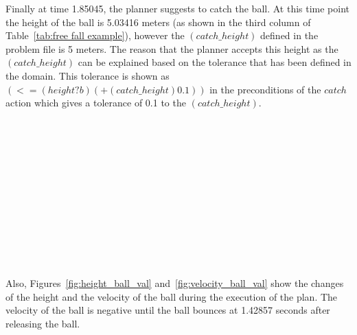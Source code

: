 Finally at time 1.85045, the planner suggests to catch the ball. At this time point the height of the ball is 5.03416 meters (as shown in the third column of Table~\ref{tab:free fall example}), however the $(catch\_height)$ defined in the problem file is 5 meters. The reason that the planner accepts this height as the $(catch\_height)$ can be explained based on the tolerance that has been defined in the domain. This tolerance is shown as $ (<= (height ?b) (+ (catch\_height) 0.1))$ in the preconditions of the $catch$ action which gives a tolerance of 0.1 to the $(catch\_height)$.

\begin{tabbing}
\headingtimedetails 
{} \> \\
 \> \\
 \> \\
 \> \\
\\
 \> \\
 \> \\
 \> \\
\\
  \> \eventtriggered \\
\> \\
\end{tabbing}

Also, Figures~\ref{fig:height_ball_val} and~\ref{fig:velocity_ball_val} show the changes of the height and the velocity of the ball during the execution of the plan. The velocity of the ball is negative until the ball bounces at 1.42857 seconds after releasing the ball. 

